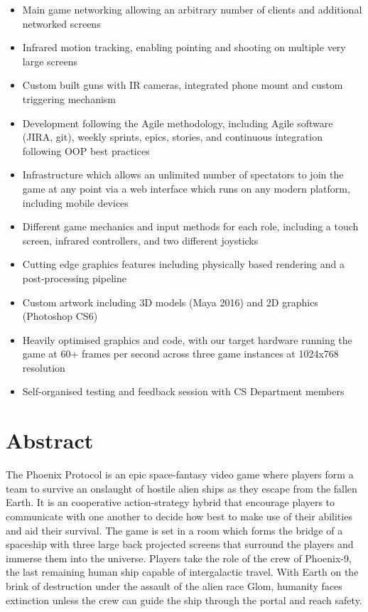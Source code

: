 \documentclass[a4paper,11pt]{article}
\begin{document}
\begin{itemize}
	\large

  \item Main game networking allowing an arbitrary number of clients and additional networked screens
  \item Infrared motion tracking, enabling pointing and shooting on multiple very large screens
  \item Custom built guns with IR cameras, integrated phone mount and custom triggering mechanism
  \item Development following the Agile methodology, including Agile software (JIRA, git), weekly sprints, epics, stories, and continuous integration following OOP best practices
  \item Infrastructure which allows an unlimited number of spectators to join the game at any point via a web interface which runs on any modern platform, including mobile devices
  \item Different game mechanics and input methods for each role, including a touch screen, infrared controllers, and two different joysticks 
  \item Cutting edge graphics features including physically based rendering and a post-processing pipeline
  \item Custom artwork including 3D models (Maya 2016) and 2D graphics (Photoshop CS6)
  \item Heavily optimised graphics and code, with our target hardware running the game at 60+ frames per second across three game instances at 1024x768 resolution
  \item Self-organised testing and feedback session with CS Department members
\end{itemize}

\clearpage

\section{Abstract}
The Phoenix Protocol is an epic space-fantasy video game where players form a team to survive an onslaught of hostile alien ships as they escape from the fallen Earth. It is an cooperative action-strategy hybrid that encourage players to communicate with one another to decide how best to make use of their abilities and aid their survival. The game is set in a room which forms the bridge of a spaceship with three large back projected screens that surround the players and immerse them into the universe. 
Players take the role of the crew of Phoenix-9, the last remaining human ship capable of intergalactic travel. With Earth on the brink of destruction under the assault of the alien race Glom, humanity faces extinction unless the crew can guide the ship through the portal and reach safety.
\end{document}
